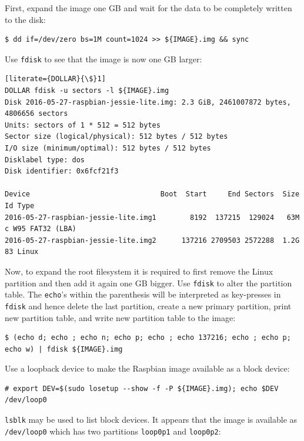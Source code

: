 First, expand the image one \ac{GB} and wait for the data to be completely written
to the disk:
\begin{lstlisting}[]
$ dd if=/dev/zero bs=1M count=1024 >> ${IMAGE}.img && sync
\end{lstlisting}
\FloatBarrier
\vspace{-5mm}

Use \texttt{fdisk} to see that the image is now one \ac{GB} larger:
\begin{lstlisting}[literate={DOLLAR}{\$}1]
DOLLAR fdisk -u sectors -l ${IMAGE}.img
Disk 2016-05-27-raspbian-jessie-lite.img: 2.3 GiB, 2461007872 bytes, 4806656 sectors
Units: sectors of 1 * 512 = 512 bytes
Sector size (logical/physical): 512 bytes / 512 bytes
I/O size (minimum/optimal): 512 bytes / 512 bytes
Disklabel type: dos
Disk identifier: 0x6fcf21f3

Device                               Boot  Start     End Sectors  Size Id Type
2016-05-27-raspbian-jessie-lite.img1        8192  137215  129024   63M  c W95 FAT32 (LBA)
2016-05-27-raspbian-jessie-lite.img2      137216 2709503 2572288  1.2G 83 Linux
\end{lstlisting}
\FloatBarrier
\vspace{-5mm}

Now, to expand the root filesystem it is required to first remove the Linux partition
and then add it again one \ac{GB} bigger.
Use \texttt{fdisk} to alter the partition table. The \texttt{echo}'s within the parenthesis
will be interpreted as
key-presses in \texttt{fdisk} and hence delete the last partition, create a new
primary partition, print new partition table, and write new partition table
to the image:

\begin{lstlisting}[]
$ (echo d; echo ; echo n; echo p; echo ; echo 137216; echo ; echo p; echo w) | fdisk ${IMAGE}.img
\end{lstlisting}
\FloatBarrier
\vspace{-5mm}

Use a loopback device to make the Raspbian image available as a block device: 
\begin{lstlisting}[]
# export DEV=$(sudo losetup --show -f -P ${IMAGE}.img); echo $DEV
/dev/loop0
\end{lstlisting}
\FloatBarrier
\vspace{-5mm}

\texttt{lsblk} may be used to list block devices. It appears that the image is
available as \texttt{/dev/loop0} which has two partitions \texttt{loop0p1} and
\texttt{loop0p2}:

